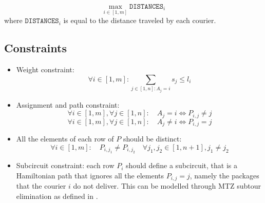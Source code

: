 \[ \max_{i \in [1, m]} \texttt{DISTANCES}_i  \]
where $\texttt{DISTANCES}_i$ is equal to the distance traveled by each courier.

\subsection{Constraints}

\begin{itemize}
    \item Weight constraint: 
    \begin{equation}
        \forall i \in [1, m]: \sum_{j \in [1, n]: A_j = i} s_j \leq l_i 
    \end{equation}

    \item Assignment and path constraint:
    \begin{equation}
        \forall i \in [1, m], \forall j \in [1, n]: \quad A_j = i \Longleftrightarrow P_{i,j} \neq j
    \end{equation}
    \begin{equation}
        \forall i \in [1, m], \forall j \in [1, n]: \quad A_j \neq i \Longleftrightarrow P_{i,j} = j
    \end{equation}

    \item All the elements of each row of $P$ should be distinct:
    \begin{equation}
        \forall i \in [1, m]: \quad P_{i,j_1} \neq P_{i,j_2} \quad \forall j_1,j_2 \in [1, n+1], j_1 \neq j_2 
    \end{equation}



    \item Subcircuit constraint: each row $P_i$ should define a subcircuit, that is a Hamiltonian path that ignores all the elements $P_{i,j} = j$, namely the packages that the courier $i$ do not deliver. This can be modelled through MTZ subtour elimination as defined in .

\end{itemize}


